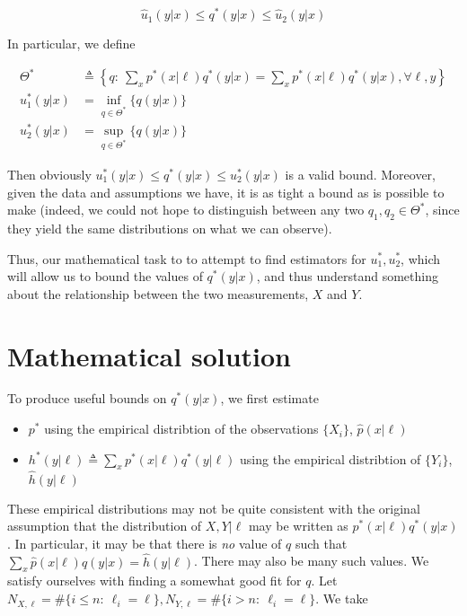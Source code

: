 \begin{equation}\label{eq:ubound}
\hat u_1(y|x) \leq q^*(y|x) \leq \hat u_2(y|x)
\end{equation}

In particular, we define

\begin{align*}
\Theta^* &\triangleq\left\{q:\ \sum_x p^*(x|\ell) q^*(y|x) =\sum_x p^*(x|\ell)q^*(y|x), \forall \ell,y\right\}\\ 
u_1^*(y|x) &= \inf_{q\in\Theta^*} \{q(y|x)\} \\
u_2^*(y|x) &= \sup_{q\in\Theta^*} \{q(y|x)\}
\end{align*}

Then obviously $u_1^*(y|x) \leq q^*(y|x)\leq u_2^*(y|x)$ is a valid bound.  Moreover, given the data and assumptions
we have, it is as tight a bound as is possible to make (indeed, we could not hope to
distinguish between any two $q_1,q_2 \in \Theta^*$, since they yield the same distributions on what we can
observe).

Thus, our mathematical task to to attempt to find estimators for $u_1^*,u_2^*$, which will allow us to bound
the values of $q^*(y|x)$, and thus understand something about the relationship between the two measurements, $X$ and
$Y$.

\section{Mathematical solution}

To produce useful bounds on $q^*(y|x)$, we first estimate

\begin{itemize}
\item $p^*$ using the empirical distribtion of the observations $\{X_i\}$, $\hat p(x|\ell)$
\item $h^*(y|\ell)\triangleq \sum_x p^*(x|\ell)q^*(y|\ell)$ using the empirical distribtion of $\{Y_i\}$, $\hat h(y|\ell)$
\end{itemize}

These empirical distributions may not be quite consistent with the original assumption that the distribution
of $X,Y|\ell$ may be written as $p^*(x|\ell)q^*(y|x)$.  In particular, it may be that there is \emph{no} value of $q$ such
that $\sum_x \hat p(x|\ell) q(y|x) = \hat h(y|\ell)$.  There may also be many such values.  We satisfy ourselves
with finding a somewhat good fit for $q$.  Let 
$N_{X,\ell}=\#\{i\leq n:\ \ell_i=\ell\},N_{Y,\ell}=\#\{i> n:\ \ell_i=\ell\}$.  We take

